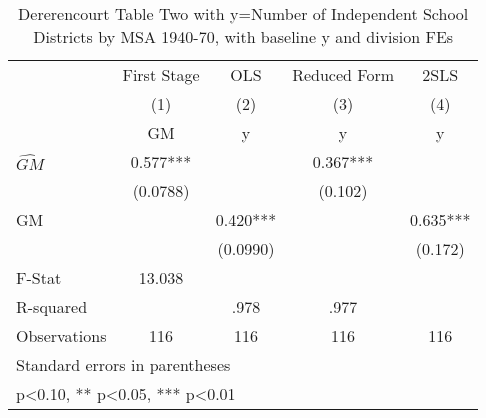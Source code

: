 \begin{table}[htbp]\centering
\def\sym#1{\ifmmode^{#1}\else\(^{#1}\)\fi}
\caption{Dererencourt Table Two with y=Number of Independent School Districts by MSA 1940-70, with baseline y and division FEs}
\begin{tabular}{l*{4}{c}}
\toprule
                    & First Stage   &         OLS   &Reduced Form   &        2SLS   \\
                    &\multicolumn{1}{c}{(1)}&\multicolumn{1}{c}{(2)}&\multicolumn{1}{c}{(3)}&\multicolumn{1}{c}{(4)}\\
                    &\multicolumn{1}{c}{GM}&\multicolumn{1}{c}{y}&\multicolumn{1}{c}{y}&\multicolumn{1}{c}{y}\\
\midrule
$\hat{GM}$          &       0.577***&               &       0.367***&               \\
                    &    (0.0788)   &               &     (0.102)   &               \\
\addlinespace
GM                  &               &       0.420***&               &       0.635***\\
                    &               &    (0.0990)   &               &     (0.172)   \\
\midrule
F-Stat              &      13.038   &               &               &               \\
R-squared           &               &        .978   &        .977   &               \\
Observations        &         116   &         116   &         116   &         116   \\
\bottomrule
\multicolumn{5}{l}{\footnotesize Standard errors in parentheses}\\
\multicolumn{5}{l}{\footnotesize * p<0.10, ** p<0.05, *** p<0.01}\\
\end{tabular}
\end{table}
